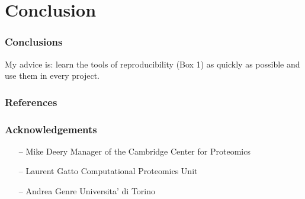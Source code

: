 \documentclass{beamer}
\begin{document}
\section{Conclusion}

\begin{frame}
\frametitle{Conclusions}

My advice is: learn the tools of reproducibility (Box 1) as quickly as possible and use them in every project.
\end{frame}


\begin{frame}
\frametitle{References}
\fontsize{6}{7.2}\selectfont


\end{frame}

\begin{frame}
\frametitle{Acknowledgements}
\begin{itemize}
\item[--] \Large Mike Deery \small{ Manager of the Cambridge Center for Proteomics}
\item[--] \Large Laurent Gatto \small{Computational Proteomics Unit}
\vspace{20px}
\item[--] \Large Andrea Genre \small{Universita' di Torino}
\end{itemize}
\end{frame}



\end{document}
